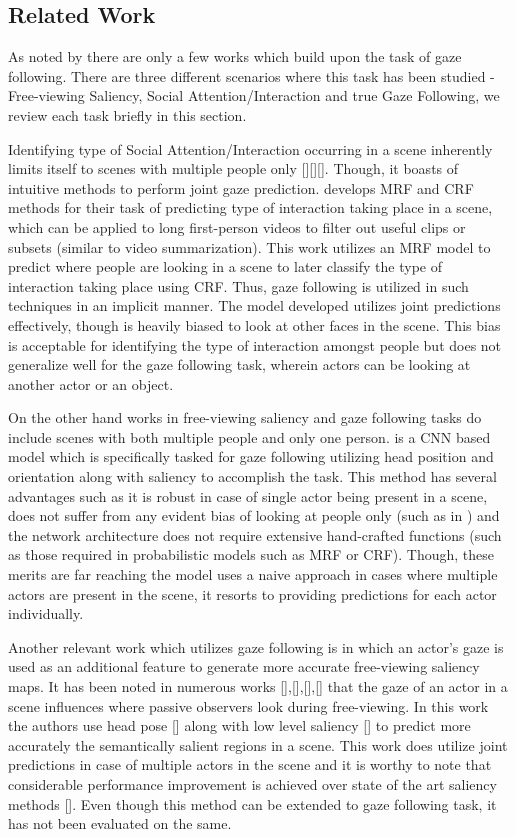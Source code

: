 \documentclass[10pt,twocolumn,letterpaper]{article}
\begin{document}
\subsection{Related Work}

As noted by \cite{fathi2012social} there are only a few works which build upon the task of gaze following. There are three different scenarios where this task has been studied - Free-viewing Saliency, Social Attention/Interaction and true Gaze Following, we review each task briefly in this section.

Identifying type of Social Attention/Interaction occurring in a scene inherently limits itself to scenes with multiple people only \cite{fathi2012social}[][][]. Though, it boasts of intuitive methods to perform joint gaze prediction. \cite{fathi2012social} develops MRF and CRF methods for their task of predicting type of interaction taking place in a scene, which can be applied to long first-person videos to filter out useful clips or subsets (similar to video summarization). This work utilizes an MRF model to predict where people are looking in a scene to later classify the type of interaction taking place using CRF. Thus, gaze following is utilized in such techniques in an implicit manner. The model developed utilizes joint predictions effectively, though is heavily biased to look at other faces in the scene. This bias is acceptable for identifying the type of interaction amongst people but does not generalize well for the gaze following task, wherein actors can be looking at another actor or an object.

 On the other hand works in free-viewing saliency and gaze following tasks do include scenes with both multiple people and only one person. \cite{fathi2012social} is a CNN based model which is specifically tasked for gaze following utilizing head position and orientation along with saliency to accomplish the task. This method has several advantages such as it is robust in case of single actor being present in a scene, does not suffer from any evident bias of looking at people only (such as in \cite{nips15_recasens}) and the network architecture does not require extensive hand-crafted functions (such as those required in probabilistic models such as MRF or CRF). Though, these merits are far reaching the model uses a naive approach in cases where multiple actors are present in the scene, it resorts to providing predictions for each actor individually.

 Another relevant work which utilizes gaze following is \cite{parks2015augmented} in which an actor’s gaze is used as an additional feature to generate more accurate free-viewing saliency maps. It has been noted in numerous works [],[],[],[] that the gaze of an actor in a scene influences where passive observers look during free-viewing. In this work the authors use head pose [] along with low level saliency [] to predict more accurately the semantically salient regions in a scene. This work does utilize joint predictions in case of multiple actors in the scene and it is worthy to note that considerable performance improvement is achieved over state of the art saliency methods []. Even though this method can be extended to gaze following task, it has not been evaluated on the same.
\end{document}
